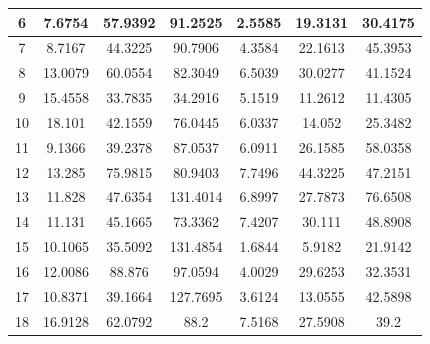 \documentclass[12pt]{article}
\begin{document}
\begin{table}[htbp]
{\begin{tabular}{|c|ccc|ccc|}
				6         & \multicolumn{1}{c|}{7.6754}  & \multicolumn{1}{c|}{57.9392} & 91.2525  & \multicolumn{1}{c|}{2.5585}  & \multicolumn{1}{c|}{19.3131}  & 30.4175  \\ \hline
				7         & \multicolumn{1}{c|}{8.7167}  & \multicolumn{1}{c|}{44.3225} & 90.7906  & \multicolumn{1}{c|}{4.3584}  & \multicolumn{1}{c|}{22.1613}  & 45.3953  \\ \hline
				8         & \multicolumn{1}{c|}{13.0079} & \multicolumn{1}{c|}{60.0554} & 82.3049  & \multicolumn{1}{c|}{6.5039}  & \multicolumn{1}{c|}{30.0277}  & 41.1524  \\ \hline
				9         & \multicolumn{1}{c|}{15.4558} & \multicolumn{1}{c|}{33.7835} & 34.2916  & \multicolumn{1}{c|}{5.1519}  & \multicolumn{1}{c|}{11.2612}  & 11.4305  \\ \hline
				10        & \multicolumn{1}{c|}{18.101}  & \multicolumn{1}{c|}{42.1559} & 76.0445  & \multicolumn{1}{c|}{6.0337}  & \multicolumn{1}{c|}{14.052}   & 25.3482  \\ \hline
				11        & \multicolumn{1}{c|}{9.1366}  & \multicolumn{1}{c|}{39.2378} & 87.0537  & \multicolumn{1}{c|}{6.0911}  & \multicolumn{1}{c|}{26.1585}  & 58.0358  \\ \hline
				12        & \multicolumn{1}{c|}{13.285}  & \multicolumn{1}{c|}{75.9815} & 80.9403  & \multicolumn{1}{c|}{7.7496}  & \multicolumn{1}{c|}{44.3225}  & 47.2151  \\ \hline
				13        & \multicolumn{1}{c|}{11.828}  & \multicolumn{1}{c|}{47.6354} & 131.4014 & \multicolumn{1}{c|}{6.8997}  & \multicolumn{1}{c|}{27.7873}  & 76.6508  \\ \hline
				14        & \multicolumn{1}{c|}{11.131}  & \multicolumn{1}{c|}{45.1665} & 73.3362  & \multicolumn{1}{c|}{7.4207}  & \multicolumn{1}{c|}{30.111}   & 48.8908  \\ \hline
				15        & \multicolumn{1}{c|}{10.1065} & \multicolumn{1}{c|}{35.5092} & 131.4854 & \multicolumn{1}{c|}{1.6844}  & \multicolumn{1}{c|}{5.9182}   & 21.9142  \\ \hline
				16        & \multicolumn{1}{c|}{12.0086} & \multicolumn{1}{c|}{88.876}  & 97.0594  & \multicolumn{1}{c|}{4.0029}  & \multicolumn{1}{c|}{29.6253}  & 32.3531  \\ \hline
				17        & \multicolumn{1}{c|}{10.8371} & \multicolumn{1}{c|}{39.1664} & 127.7695 & \multicolumn{1}{c|}{3.6124}  & \multicolumn{1}{c|}{13.0555}  & 42.5898  \\ \hline
				18        & \multicolumn{1}{c|}{16.9128} & \multicolumn{1}{c|}{62.0792} & 88.2     & \multicolumn{1}{c|}{7.5168}  & \multicolumn{1}{c|}{27.5908}  & 39.2     \\ \hline

\end{tabular}}
\end{table}
\end{document}
